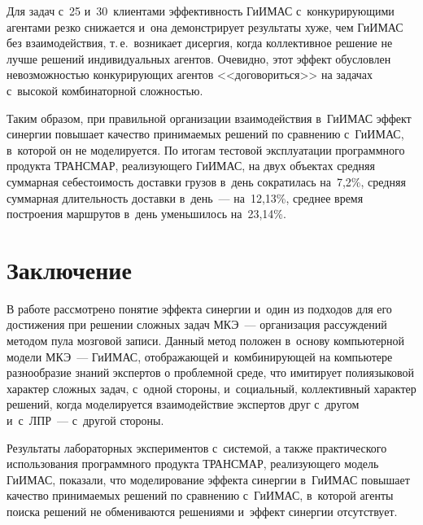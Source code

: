\begin{multicols}{2}
  Для задач с~25 и~30~клиентами эффективность \mbox{ГиИМАС}
с~конкурирующими агентами резко снижается и~она демонстрирует 
результаты хуже, чем  
\mbox{ГиИМАС} без взаимодействия, т.\,е.\ возникает дисергия, когда коллективное 
решение не лучше решений индивидуальных агентов. Очевидно, этот эффект 
обусловлен невозможностью кон\-ку\-ри\-ру\-ющих агентов <<договориться>> на 
задачах с~высокой комбинаторной сложностью. 
  
  Таким образом, при правильной организации взаимодействия в~ГиИМАС 
эффект синергии повы\-шает качество принимаемых решений по сравнению 
с~ГиИМАС, в~которой он не моделируется. По итогам тестовой эксплуатации 
программного продукта ТРАНСМАР, реализующего ГиИМАС, на двух 
объектах средняя суммарная себестоимость доставки грузов в~день сократилась 
на~7,2\%, средняя суммарная длительность доставки в~день~--- на~12,13\%, 
среднее время построения маршрутов в~день уменьшилось на~23,14\%.

\section{Заключение}

  В работе рассмотрено понятие эффекта синергии и~один из подходов для его 
достижения при решении сложных задач МКЭ~--- организация рассуждений 
методом пула мозговой записи. Данный метод положен в~основу компьютерной 
модели МКЭ~--- ГиИМАС, отображающей и~ком\-би\-ни\-ру\-ющей на компьютере 
разнообразие знаний экспертов о проблемной среде, что имитирует 
полиязыковой характер сложных задач, с~одной стороны, и~социальный, 
коллективный характер решений, когда моделируется взаимодействие 
экспертов друг с~другом и~с~ЛПР~--- с~другой стороны. 

Результаты 
лабораторных экспериментов с~сис\-те\-мой, а также практического использования 
программного продукта ТРАНСМАР, реализующего модель \mbox{ГиИМАС}, 
показали, что моделирование эффекта синергии в~\mbox{ГиИМАС} повышает качество 
принимаемых решений по сравнению с~\mbox{ГиИМАС}, в~которой агенты поиска 
решений не обмениваются решениями и~эффект синергии отсутствует.
  

\end{multicols}
